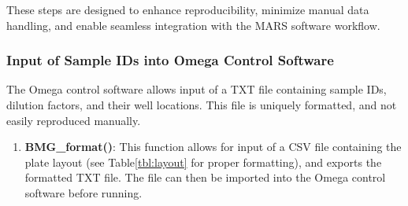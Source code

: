 \documentclass[preprint,12pt,a4paper]{elsarticle}
\providecommand{\DIFaddtex}[1]{{\protect\color{blue}\uwave{#1}}} %
\providecommand{\DIFaddbegin}{} %
\providecommand{\DIFaddend}{} %
\providecommand{\DIFadd}[1]{\texorpdfstring{\DIFaddtex{#1}}{#1}} %
\begin{document}
            These steps are designed to enhance reproducibility, minimize manual data handling, and enable seamless integration with the MARS software workflow.

            \subsubsection{Input of Sample IDs into Omega Control Software}
                The Omega control software allows input of a TXT file containing sample IDs, dilution factors, and their well locations. This file is uniquely formatted, and not easily reproduced manually.

                \begin{enumerate}
                    \item \textbf{BMG\_format()}: This function allows for input of a CSV file containing the plate layout (see Table\DIFaddbegin \DIFadd{~}\DIFaddend \ref{tbl:layout} for proper formatting), and exports the formatted TXT file. The file can then be imported into the Omega control software before running.
                \end{enumerate}
\end{document}
